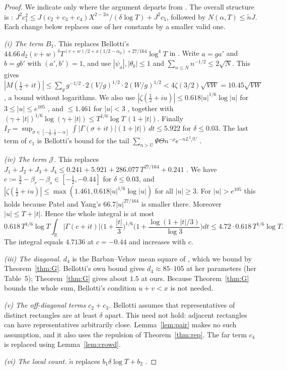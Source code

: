 \documentclass[11pt]{amsart}
\numberwithin{equation}{section}
\theoremstyle{definition}
\theoremstyle{remark}
\begin{document}
\begin{proof}
We indicate only where the argument departs from \cite{Bellotti}.
The overall structure is \cite[(4.22)--(4.23)]{Bellotti}: $J^2c_1^2 \le J(c_2+c_3+c_4)X^{2-2\alpha}/(\delta\log T) + J^2c_5$, followed by $N(\alpha,T) \le \tilde nJ$.
Each change below replaces one of her constants by a smaller valid one.

\emph{(i) The term $B_1$.}
This replaces Bellotti's $44.66\,d_2(v+w)^4T^{(v+w)/2+x(1/2-\alpha_0)+27/164}\log^4T$ in \cite[(3.17)]{Bellotti}.
Write $a = ga'$ and $b = gb'$ with $(a',b') = 1$, and use $|\psi_a|, |\theta_b| \le 1$ and $\sum_{n\le N}n^{-1/2}\le 2\sqrt N$.
This gives
$|M(\tfrac12+it)| \le \sum_g g^{-1/2}\cdot 2(V/g)^{1/2}\cdot 2(W/g)^{1/2} < 4\zeta(3/2)\sqrt{VW} = 10.45\sqrt{VW}$,
a bound without logarithms.
We also use $|\zeta(\frac12+iu)| \le 0.618|u|^{1/6}\log|u|$ for $3 \le |u| \le e^{105}$ \cite{HPY}, and $\le 1.461$ for $|u| < 3$ \cite{Hiary}, together with
$(\gamma+|t|)^{1/6}\log(\gamma+|t|) \le T^{1/6}\log T\,(1+|t|)$.
Finally $I_\Gamma = \sup_{\sigma\in[-\frac12,\frac12-\alpha]}\int|\Gamma(\sigma+it)|(1+|t|)\,dt \le 5.922$ for $\delta \le 0.03$.
The last term of $c_1$ is Bellotti's bound for the tail $\sum_{n>U}\Psi\Theta n^{-\rho}e^{-nL^2/U}$ \cite[(3.19)ff.]{Bellotti}.

\emph{(iv) The term $\mathcal J$.}
This replaces $J_1+J_2+J_3+J_4 \le 0.241 + 5.921 + 286.077\,T^{27/164} + 0.241$ \cite[(4.17)--(4.19)]{Bellotti}.
We have $c := \frac32 - \beta_r - \beta_s \in [-\frac12, -0.44]$ for $\delta\le0.03$, and $|\zeta(\frac12 + iu)| \le \max(1.461, 0.618|u|^{1/6}\log|u|)$ for all $|u|\ge3$.
For $|u| > e^{105}$ this holds because Patel and Yang's $66.7|u|^{27/164}$ \cite{PY} is smaller there.
Moreover $|u| \le T + |t|$.
Hence the whole integral \cite[(4.16)]{Bellotti} is at most
\[
0.618\,T^{1/6}\log T\int_{\mathbb R}|\Gamma(c+it)|\Big(1+\frac{|t|}3\Big)^{1/6}\Big(1 + \frac{\log(1+|t|/3)}{\log3}\Big)dt \le 4.72\cdot 0.618\,T^{1/6}\log T .
\]
The integral equals $4.7136$ at $c = -0.44$ and increases with $c$.

\emph{(iii) The diagonal.} $d_4$ is the Barban--Vehov mean square of \cite[Lemma~4.2]{Bellotti}, which we bound by Theorem~\ref{thm:G}.
Bellotti's own bound \cite[Lemma~3.3, (3.6)]{Bellotti} gives $d_4 \approx 85$--$105$ at her parameters (her Table~5); Theorem~\ref{thm:G} gives about $1.5$ at ours.
Because Theorem~\ref{thm:G} bounds the whole sum, Bellotti's condition $u+v<x$ is not needed.

\emph{(v) The off-diagonal terms $c_2+c_3$.}
Bellotti assumes \cite[(4.11)]{Bellotti} that representatives of distinct rectangles are at least $\delta$ apart.
This need not hold: adjacent rectangles can have representatives arbitrarily close.
Lemma~\ref{lem:pair} makes no such assumption, and it also uses the repulsion of Theorem~\ref{thm:rep}.
The far term $c_4$ is replaced using Lemma~\ref{lem:crowd}.

\emph{(vi) The local count.} $\tilde n$ replaces $b_1\delta\log T + b_2$ \cite[Lemma~2.4]{Bellotti}.
\end{proof}
\end{document}
